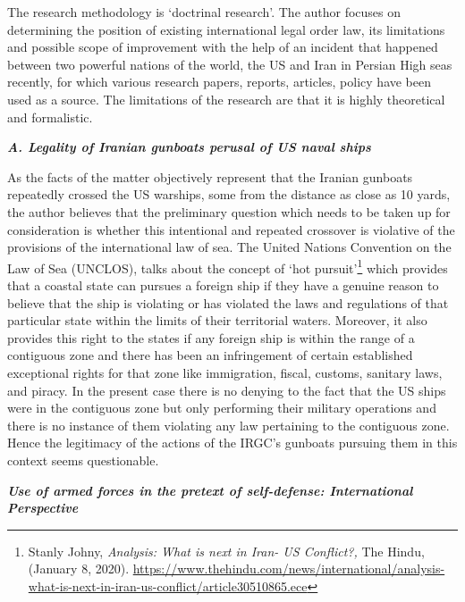 \begin{multicols}{2}
\noi
The research methodology is ‘doctrinal research’. The author focuses on determining the
position of existing international legal order law, its limitations and possible scope of
improvement with the help of an incident that happened between two powerful nations of
the world, the US and Iran in Persian High seas recently, for which various research papers,
reports, articles, policy have been used as a source. The limitations of the research are that it
is highly theoretical and formalistic.


\noi
\textbf{\textit{A. Legality of Iranian gunboats perusal of US naval ships}}

\noi
As the facts of the matter objectively represent that the Iranian gunboats repeatedly crossed
the US warships, some from the distance as close as 10 yards, the author believes that the
preliminary question which needs to be taken up for consideration is whether this intentional
and repeated crossover is violative of the provisions of the international law of sea. The
United Nations Convention on the Law of Sea (UNCLOS), talks about the concept of ‘hot
pursuit’\footnote{Stanly Johny, \textit{Analysis: What is next in Iran- US Conflict?,} The Hindu, (January 8, 2020).
\url{https://www.thehindu.com/news/international/analysis-what-is-next-in-iran-us-conflict/article30510865.ece}}  which provides that a coastal state can pursues a foreign ship if they have a
genuine reason to believe that the ship is violating or has violated the laws and regulations
of that particular state within the limits of their territorial waters. Moreover, it also provides
this right to the states if any foreign ship is within the range of a contiguous zone and there
has been an infringement of certain established exceptional rights for that zone like
immigration, fiscal, customs, sanitary laws, and piracy. In the present case there is no
denying to the fact that the US ships were in the contiguous zone but only performing their
military operations and there is no instance of them violating any law pertaining to the
contiguous zone. Hence the legitimacy of the actions of the IRGC’s gunboats pursuing them
in this context seems questionable.

\vspace{-.1cm}

\noi
\textbf{\textit{Use of armed forces in the pretext of self-defense: International Perspective}}

\vspace{-.1cm}


\end{multicols}
